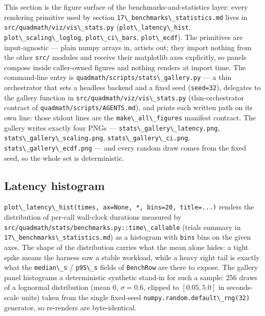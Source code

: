 \documentclass[
  10pt,
]{article}
\newcommand{\passthrough}[1]{#1}
\begin{document}
This section is the figure surface of the benchmarks-and-statistics
layer: every rendering primitive used by section
\passthrough{\lstinline!17\_benchmarks\_statistics.md!} lives in
\passthrough{\lstinline!src/quadmath/viz/vis\_stats.py!}
(\passthrough{\lstinline!plot\_latency\_hist!},
\passthrough{\lstinline!plot\_scaling\_loglog!},
\passthrough{\lstinline!plot\_ci\_bars!},
\passthrough{\lstinline!plot\_ecdf!}). The primitives are input-agnostic
--- plain numpy arrays in, artists out; they import nothing from the
other \passthrough{\lstinline!src/!} modules and receive their
matplotlib axes explicitly, so panels compose inside caller-owned
figures and nothing renders at import time. The command-line entry is
\passthrough{\lstinline!quadmath/scripts/stats\_gallery.py!} --- a thin
orchestrator that sets a headless backend and a fixed seed
(\passthrough{\lstinline!seed=32!}), delegates to the gallery function
in \passthrough{\lstinline!src/quadmath/viz/vis\_stats.py!}
(thin-orchestrator contract of
\passthrough{\lstinline!quadmath/scripts/AGENTS.md!}), and prints each
written path on its own line: those stdout lines are the
\passthrough{\lstinline!make\_all\_figures!} manifest contract. The
gallery writes exactly four PNGs ---
\passthrough{\lstinline!stats\_gallery\_latency.png!},
\passthrough{\lstinline!stats\_gallery\_scaling.png!},
\passthrough{\lstinline!stats\_gallery\_ci.png!},
\passthrough{\lstinline!stats\_gallery\_ecdf.png!} --- and every random
draw comes from the fixed seed, so the whole set is deterministic.

\subsection{Latency histogram}\label{latency-histogram}

\passthrough{\lstinline!plot\_latency\_hist(times, ax=None, *, bins=20, title=...)!}
renders the distribution of per-call wall-clock durations measured by
\passthrough{\lstinline!src/quadmath/stats/benchmarks.py::time\_callable!}
(trials summary in
\passthrough{\lstinline!17\_benchmarks\_statistics.md!}) as a histogram
with \passthrough{\lstinline!bins!} bins on the given axes. The shape of
the distribution carries what the mean alone hides: a tight spike means
the harness saw a stable workload, while a heavy right tail is exactly
what the \passthrough{\lstinline!median\_s!} /
\passthrough{\lstinline!p95\_s!} fields of
\passthrough{\lstinline!BenchRow!} are there to expose. The gallery
panel histograms a deterministic synthetic stand-in for such a sample:
256 draws of a lognormal distribution (mean 0, \(\sigma = 0.6\), clipped
to \([0.05, 5.0]\) in seconds-scale units) taken from the single
fixed-seed \passthrough{\lstinline!numpy.random.default\_rng(32)!}
generator, so re-renders are byte-identical.
\end{document}

